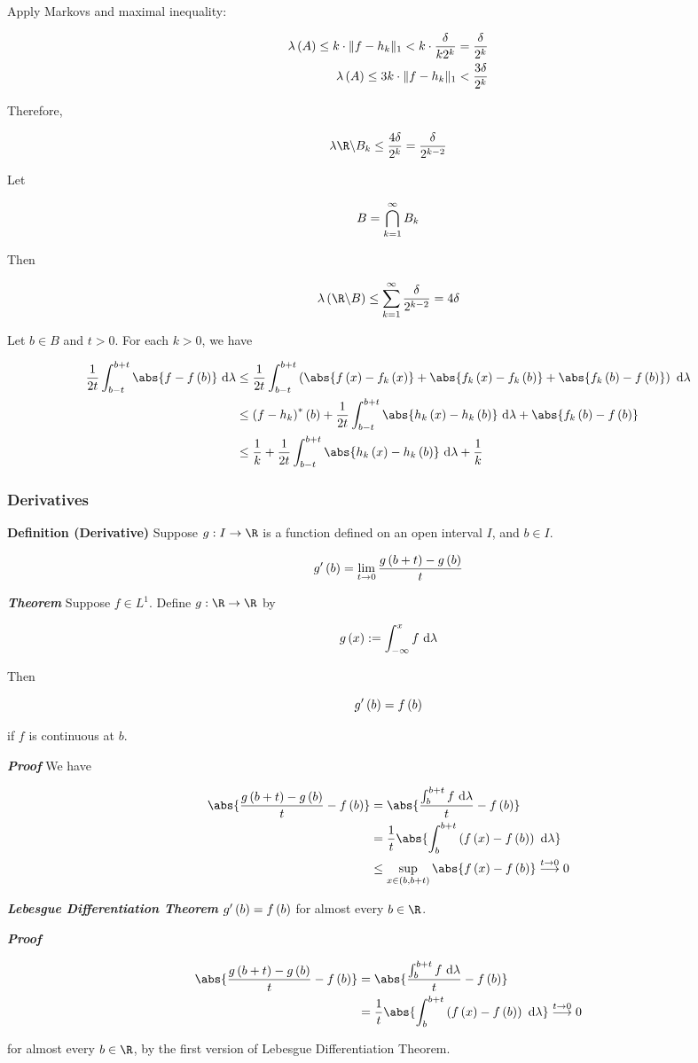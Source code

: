 \documentclass[
]{article}
\begin{document}
Apply Markov\textquotesingle s and maximal inequality:

\[\begin{aligned}
\lambda\left(A\right)\le k\cdot \|{f-h_k}\|_{1}<k\cdot\frac{\delta}{k2^k} = \frac{\delta}{2^k}\\
\lambda\left(A\right)\le 3k\cdot \|{f-h_k}\|_{1}< \frac{3\delta}{2^k}\\
\end{aligned}\]

Therefore,

\[\lambda{\R\c B_k}\le \frac{4\delta}{2^k} = \frac{\delta}{2^{k-2}}\]

Let

\[B = \bigcap_{{k} = 1}^{\infty} B_k\]

Then

\[\lambda\pr{\R\c B}\le \sinf \frac{\delta}{2^{k-2}} = 4\delta\]

Let \(b\in B\) and \(t>0\). For each \(k>0\), we have

\[\ba
\frac1{2t}\int_{b-t}^{b+t}\abs{f-f\pr{b}}\dl & \le \frac1{2t}\int_{b-t}^{b+t}\pr{\abs{f\pr{x}-f_k\pr{x}}+\abs{f_k\pr{x}-f_k\pr{b}}+\abs{f_k\pr{b}-f\pr{b}}}\dl\\
& \le \pr{f-h_k}^*\pr{b}+\frac{1}{2t}\int_{b-t}^{b+t}\abs{h_k\pr{x}-h_k\pr{b}}\dl + \abs{f_k\pr{b}-f\pr{b}}\\
& \le \frac1k+\frac{1}{2t}\int_{b-t}^{b+t}\abs{h_k\pr{x}-h_k\pr{b}}\dl+\frac1k
\ea\]

\hypertarget{derivatives}{%
\subsubsection{Derivatives}\label{derivatives}}

\textbf{Definition (Derivative)} Suppose \(g:I\to \R\) is a function
defined on an open interval \(I\), and \(b\in I\).

\[g'\left(b\right) = \lim_{t\to 0}\frac{g\left(b+t\right)-g\left(b\right)}{t}\]

\emph{\textbf{Theorem}} Suppose \(f\in L^1\). Define \(g:\R\to \R\) by

\[g\left(x\right):= \int_{-\infty}^xf\text{ d}\lambda\]

Then

\[g'\left(b\right) = f\left(b\right)\]

if \(f\) is continuous at \(b\).

\emph{\textbf{Proof}} We have

\[\ba
\abs{\frac{g\pr{b+t}-g\pr{b}}{t}-f\pr{b}} & = \abs{\frac{\int_b^{b+t}f\dl}{t}-f\pr{b}} \\
& = \frac1t\abs{\int_b^{b+t}\pr{f\pr{x}-f\pr{b}}\dl}\\
& \le \sup_{x\in\pr{b,b+t}}\abs{f\pr{x}-f\pr{b}}\overset{t\to 0}{\longrightarrow}0
\ea\]

\emph{\textbf{Lebesgue Differentiation Theorem}} \(g'\left(b\right) = f\left(b\right)\)
for almost every \(b\in \R\).

\emph{\textbf{Proof}}

\[\ba
\abs{\frac{g\pr{b+t}-g\pr{b}}{t}-f\pr{b}} & = \abs{\frac{\int_b^{b+t}f\dl}{t}-f\pr{b}} \\
& = \frac1t\abs{\int_b^{b+t}\pr{f\pr{x}-f\pr{b}}\dl}\overset{t\to 0}{\longrightarrow}0
\ea\]

for almost every \(b\in \R\), by the first version of Lebesgue
Differentiation Theorem.
\end{document}
